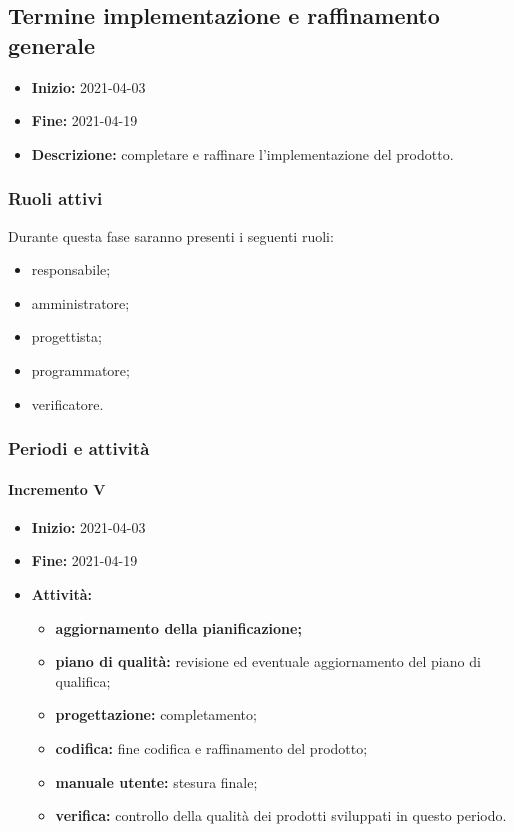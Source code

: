 

\subsection{Termine implementazione e raffinamento generale} \label{_pianificazioneTermineImplementazione}
\begin{itemize}
    \item [] \textbf{Inizio:} 2021-04-03
    \item [] \textbf{Fine:} 2021-04-19
    \item [] \textbf{Descrizione:} completare e raffinare l'implementazione del prodotto.
\end{itemize}

\subsubsection{Ruoli attivi}
Durante questa fase saranno presenti i seguenti ruoli:
\begin{itemize}
    \item responsabile;
    \item amministratore;
    \item progettista;
    \item programmatore;
    \item verificatore.
\end{itemize}

\subsubsection{Periodi e attività}

\paragraph[Incremento V]{Incremento V}
\begin{itemize}
    \item [] \textbf{Inizio:} 2021-04-03
    \item [] \textbf{Fine:} 2021-04-19
    \item [] \textbf{Attività:}
          \begin{itemize}
              \item \textbf{aggiornamento della pianificazione;}
              \item \textbf{piano di qualità:} revisione ed eventuale aggiornamento del piano di qualifica;
              \item \textbf{progettazione:} completamento;
              \item \textbf{codifica:} fine codifica e raffinamento del prodotto;
              \item \textbf{manuale utente:} stesura finale;
              \item \textbf{verifica:} controllo della qualità dei prodotti sviluppati in questo periodo.
          \end{itemize}
\end{itemize}

